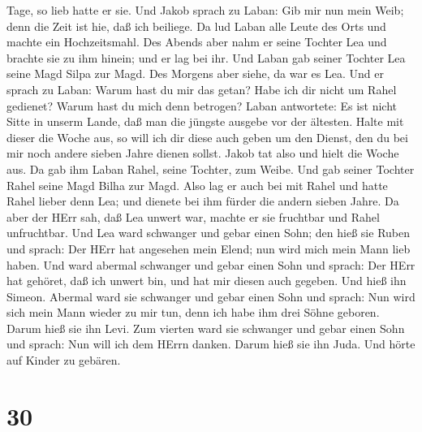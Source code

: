 Tage, so lieb hatte er sie.  Und Jakob sprach zu Laban: Gib
mir nun mein Weib; denn die Zeit ist hie, daß ich beiliege.
 Da lud Laban alle Leute des Orts und machte ein
Hochzeitsmahl.  Des Abends aber nahm er seine Tochter Lea
und brachte sie zu ihm hinein; und er lag bei ihr.  Und
Laban gab seiner Tochter Lea seine Magd Silpa zur Magd. 
Des Morgens aber siehe, da war es Lea. Und er sprach zu Laban: Warum
hast du mir das getan? Habe ich dir nicht um Rahel gedienet? Warum hast
du mich denn betrogen?  Laban antwortete: Es ist nicht
Sitte in unserm Lande, daß man die jüngste ausgebe vor der ältesten.
 Halte mit dieser die Woche aus, so will ich dir diese auch
geben um den Dienst, den du bei mir noch andere sieben Jahre dienen
sollst.  Jakob tat also und hielt die Woche aus. Da gab ihm
Laban Rahel, seine Tochter, zum Weibe.  Und gab seiner
Tochter Rahel seine Magd Bilha zur Magd.  Also lag er auch
bei mit Rahel und hatte Rahel lieber denn Lea; und dienete bei ihm
fürder die andern sieben Jahre.  Da aber der HErr sah, daß
Lea unwert war, machte er sie fruchtbar und Rahel unfruchtbar.
 Und Lea ward schwanger und gebar einen Sohn; den hieß sie
Ruben und sprach: Der HErr hat angesehen mein Elend; nun wird mich mein
Mann lieb haben.  Und ward abermal schwanger und gebar
einen Sohn und sprach: Der HErr hat gehöret, daß ich unwert bin, und hat
mir diesen auch gegeben. Und hieß ihn Simeon.  Abermal ward
sie schwanger und gebar einen Sohn und sprach: Nun wird sich mein Mann
wieder zu mir tun, denn ich habe ihm drei Söhne geboren. Darum hieß sie
ihn Levi.  Zum vierten ward sie schwanger und gebar einen
Sohn und sprach: Nun will ich dem HErrn danken. Darum hieß sie ihn Juda.
Und hörte auf Kinder zu gebären.

\hypertarget{section-29}{%
\section{30}\label{section-29}}

